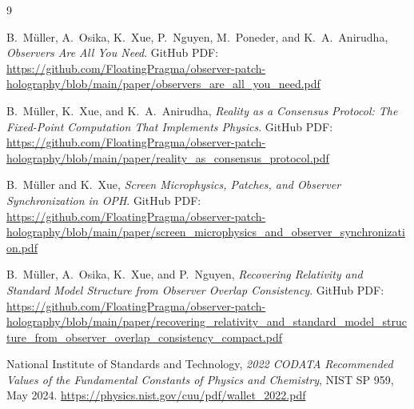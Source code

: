\documentclass[11pt]{article}
\begin{document}
\begin{thebibliography}{9}

B.\ M\"uller, A.\ Osika, K.\ Xue, P.\ Nguyen, M.\ Poneder, and K.\ A.\ Anirudha,
\emph{Observers Are All You Need}.
GitHub PDF:
\url{https://github.com/FloatingPragma/observer-patch-holography/blob/main/paper/observers_are_all_you_need.pdf}

B.\ M\"uller, K.\ Xue, and K.\ A.\ Anirudha,
\emph{Reality as a Consensus Protocol: The Fixed-Point Computation That Implements Physics}.
GitHub PDF:
\url{https://github.com/FloatingPragma/observer-patch-holography/blob/main/paper/reality_as_consensus_protocol.pdf}

B.\ M\"uller and K.\ Xue,
\emph{Screen Microphysics, Patches, and Observer Synchronization in OPH}.
GitHub PDF:
\url{https://github.com/FloatingPragma/observer-patch-holography/blob/main/paper/screen_microphysics_and_observer_synchronization.pdf}

B.\ M\"uller, A.\ Osika, K.\ Xue, and P.\ Nguyen,
\emph{Recovering Relativity and Standard Model Structure from Observer Overlap Consistency}.
GitHub PDF:
\url{https://github.com/FloatingPragma/observer-patch-holography/blob/main/paper/recovering_relativity_and_standard_model_structure_from_observer_overlap_consistency_compact.pdf}

National Institute of Standards and Technology,
\emph{2022 CODATA Recommended Values of the Fundamental Constants of Physics and Chemistry},
NIST SP 959, May 2024.
\url{https://physics.nist.gov/cuu/pdf/wallet_2022.pdf}

\end{thebibliography}
\end{document}
